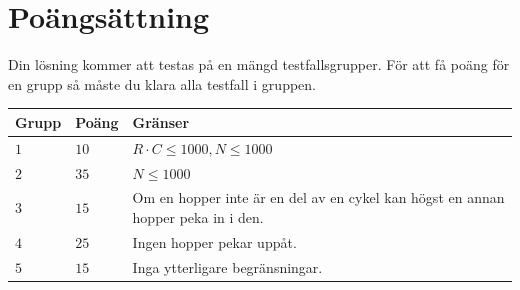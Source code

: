 \section*{Poängsättning}
Din lösning kommer att testas på en mängd testfallsgrupper.
För att få poäng för en grupp så måste du klara alla testfall i gruppen.

\noindent
\begin{tabular}{| l | l | p{12cm} |}
  \hline
  \textbf{Grupp} & \textbf{Poäng} & \textbf{Gränser} \\ \hline
  $1$    & $10$      & $R \cdot C \le 1000, N \le 1000$ \\ \hline
  $2$    & $35$      & $N \le 1000$ \\ \hline
  $3$    & $15$      & Om en hopper inte är en del av en cykel kan högst en annan hopper peka in i den. \\ \hline
  $4$    & $25$      & Ingen hopper pekar uppåt. \\ \hline
  $5$    & $15$      & Inga ytterligare begränsningar. \\ \hline
\end{tabular}
